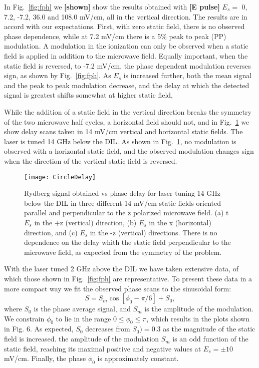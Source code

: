 \documentclass[aps,pra,preprint,groupedaddress]{revtex4-1}
\begin{document}
In Fig.~\ref{fig:fph} we \textbf{[shown]} show the results obtained with \textbf{[E pulse]} $E_{s}=$ 0, 7.2, -7.2, 36.0 and 108.0 mV/cm, all in the vertical direction. The results are in accord with our expectations. First, with zero static field, there is no observed phase dependence, while at 7.2 mV/cm there is a 5\% peak to peak (PP) modulation. A modulation in the ionization can only be observed when a static field is applied in addition to the microwave field. Equally important, when the static field is reversed, to -7.2 mV/cm, the phase dependent modulation reverses sign, as shown by Fig.~\ref{fig:fph}. As $E_s$ is increased further, both the mean signal and the peak to peak modulation decrease, and the delay at which the detected signal is greatest shifts somewhat at higher static field,


While the addition of a static field in the vertical direction breaks the symmetry of the two microwave half cycles, a horizontal field should not, and in Fig.~\ref{fig:CircleDelay} we show delay scans taken in 14 mV/cm vertical and horizontal static fields. The laser is tuned 14 GHz below the DIL. As shown in Fig.~\ref{fig:CircleDelay}, no modulation is observed with a horizontal static field, and the observed modulation changes sign when the direction of the vertical static field is reversed.


\begin{figure}
	\texttt{[image: CircleDelay]}
	\caption{Rydberg signal obtained vs phase delay for laser tuning 14 GHz below the DIL in three different 14 mV/cm static fields oriented parallel and perpendicular to the z polarized microwave field. (a) t$E_s$ in the +z (vertical) direction, (b) $E_s$ in the x (horizontal) direction, and (c) $E_s$ in the -z (vertical) directions. There is no dependence on the delay whith the static field perpendicular to the microwave field, as expected from the symmetry of the problem. }
	\label{fig:CircleDelay}
\end{figure}


With the laser tuned 2 GHz above the DIL we have taken extensive data, of which those shown in Fig.~\ref{fig:fph} are representative. To present these data in a more compact way we fit the observed phase scans to the sinusoidal form:
\begin{equation} \label{eq:modfit}
S = S_m  \cos{[ \phi_0-\pi/6]} + S_0,
\end{equation}
where $S_0$ is the phase average signal, and $S_m$ is the amplitude of the modulation. We constrain $\phi_0$ to lie in the range $0\leq \phi_0\leq \pi$, which results in the plots shown in Fig. 6. As expected, $S_0$ decreases from $S_0)=0.3$  as the magnitude of the static field is increased. the amplitude of the modulation $S_m$ is an odd function of the static field, reaching its maximal positive and negative values at $E_s=\pm 10$mV/cm. Finally, the phase $\phi_0$ is approximately constant.
\end{document}

